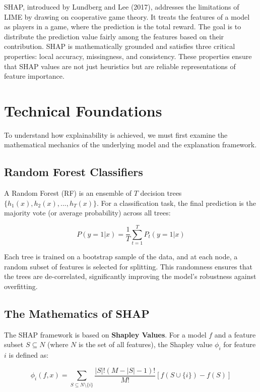 \documentclass[12pt, a4paper]{article}
\begin{document}
SHAP, introduced by Lundberg and Lee (2017), addresses the limitations of LIME by drawing on cooperative game theory. It treats the features of a model as players in a game, where the prediction is the total reward. The goal is to distribute the prediction value fairly among the features based on their contribution. SHAP is mathematically grounded and satisfies three critical properties: local accuracy, missingness, and consistency. These properties ensure that SHAP values are not just heuristics but are reliable representations of feature importance.

\section{Technical Foundations}

To understand how explainability is achieved, we must first examine the mathematical mechanics of the underlying model and the explanation framework.

\subsection{Random Forest Classifiers}

A Random Forest (RF) is an ensemble of $T$ decision trees $\{h_1(x), h_2(x), ..., h_T(x)\}$. For a classification task, the final prediction is the majority vote (or average probability) across all trees:

\begin{equation}
    P(y=1|x) = \frac{1}{T} \sum_{t=1}^T P_t(y=1|x)
\end{equation}

Each tree is trained on a bootstrap sample of the data, and at each node, a random subset of features is selected for splitting. This randomness ensures that the trees are de-correlated, significantly improving the model's robustness against overfitting.

\subsection{The Mathematics of SHAP}

The SHAP framework is based on \textbf{Shapley Values}. For a model $f$ and a feature subset $S \subseteq N$ (where $N$ is the set of all features), the Shapley value $\phi_i$ for feature $i$ is defined as:

\begin{equation}
    \phi_i(f, x) = \sum_{S \subseteq N \setminus \{i\}} \frac{|S|! (M - |S| - 1)!}{M!} [f(S \cup \{i\}) - f(S)]
\end{equation}
\end{document}
